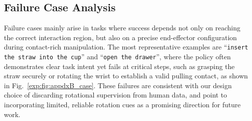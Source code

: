 \documentclass{llmxive}
\begin{document}
\begin{table}[htbp]
\centering
{}
\label{exp:tab:sec5.6}
\caption{
    \textbf{Upper bound of the bridging objective.}
    Applying the same training objective as human actions to task-specific in-lab robot actions, the bridging action itself enables even stronger skill transfer when there is no embodiment gap.
}
\end{table}





\subsection{Failure Case Analysis}
\label{exp:sec:failure}

Failure cases mainly arise in tasks where success depends not only on reaching the correct interaction region, but also on a precise end-effector configuration during contact-rich manipulation.
% 
The most representative examples are ``\texttt{insert the straw into the cup}'' and ``\texttt{open the drawer}'', where the policy often demonstrates clear task intent yet fails at critical steps, such as grasping the straw securely or rotating the wrist to establish a valid pulling contact, as shown in Fig.~\ref{exp:fig:appdxB_case}.
% 
These failures are consistent with our design choice of discarding rotational supervision from human data, and point to incorporating limited, reliable rotation cues as a promising direction for future work.
\end{document}
